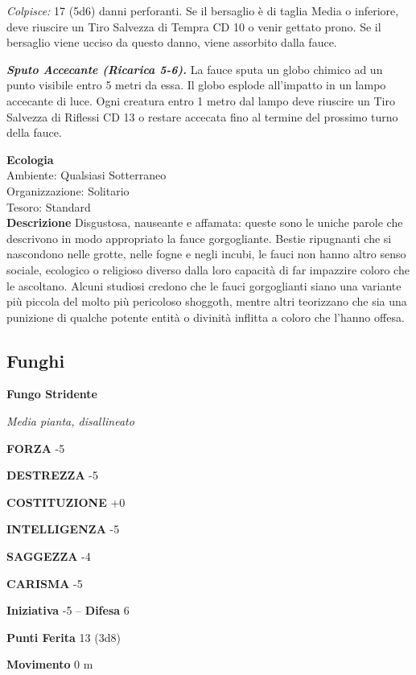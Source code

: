 \begin{multicols}{2}
\emph{Colpisce:} 17 (5d6) danni perforanti. Se il bersaglio è di taglia Media o inferiore, deve riuscire un Tiro Salvezza di Tempra CD 10 o venir gettato prono. Se il bersaglio viene ucciso da questo danno, viene assorbito dalla fauce.

\emph{\textbf{Sputo Accecante (Ricarica 5-6).}} La fauce sputa un globo chimico ad un punto visibile entro 5 metri da essa. Il globo esplode all'impatto in un lampo accecante di luce. Ogni creatura entro 1 metro dal lampo deve riuscire un Tiro Salvezza di Riflessi CD 13 o restare accecata fino al termine del prossimo turno della fauce.

\textbf{Ecologia}\\
Ambiente: Qualsiasi Sotterraneo\\
Organizzazione: Solitario\\
Tesoro: Standard\\
\textbf{Descrizione}
Disgustosa, nauseante e affamata: queste sono le uniche parole che descrivono in modo appropriato la fauce gorgogliante. Bestie ripugnanti che si nascondono nelle grotte, nelle fogne e negli incubi, le fauci non hanno altro senso sociale, ecologico o religioso diverso dalla loro capacità di far impazzire coloro che le ascoltano. Alcuni studiosi credono che le fauci gorgoglianti siano una variante più piccola del molto più pericoloso shoggoth, mentre altri teorizzano che sia una punizione di qualche potente entità o divinità inflitta a coloro che l'hanno offesa.\\




\subsection{Funghi}

\medskip{}\textbf{Fungo Stridente}

\emph{Media pianta, disallineato}

\textbf{FORZA} -5

\textbf{DESTREZZA} -5

\textbf{COSTITUZIONE} +0

\textbf{INTELLIGENZA} -5

\textbf{SAGGEZZA} -4

\textbf{CARISMA} -5

\textbf{Iniziativa} -5 -- \textbf{Difesa} 6

\textbf{Punti Ferita} 13 (3d8)

\textbf{Movimento} 0 m


\end{multicols}
